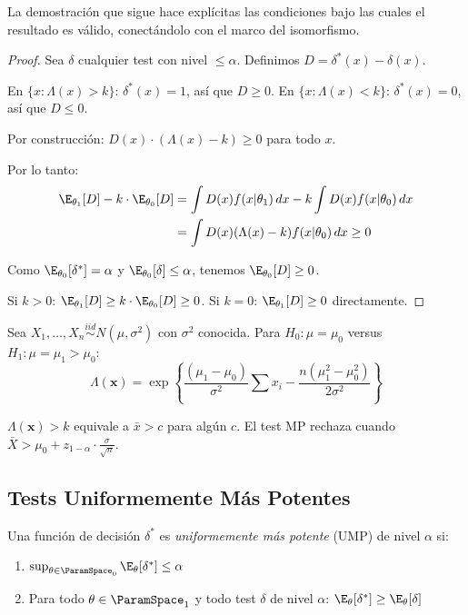 La demostración que sigue hace explícitas las condiciones bajo las cuales
el resultado es válido, conectándolo con el marco del isomorfismo.

\begin{proof}
	Sea $\delta$ cualquier test con nivel $\leq \alpha$. Definimos
	$D = \delta^*(x) - \delta(x)$.

	En $\{x : \Lambda(x) > k\}$: $\delta^*(x) = 1$, así que $D \geq 0$.
	En $\{x : \Lambda(x) < k\}$: $\delta^*(x) = 0$, así que $D \leq 0$.

	Por construcción: $D(x) \cdot (\Lambda(x) - k) \geq 0$ para todo $x$.

	Por lo tanto:
	\begin{align*}
		\E_{\theta_1}[D] - k \cdot \E_{\theta_0}[D]
		 & = \int D(x) f(x|\theta_1)\, dx - k \int D(x) f(x|\theta_0)\, dx \\
		 & = \int D(x) (\Lambda(x) - k) f(x|\theta_0)\, dx \geq 0
	\end{align*}

	Como $\E_{\theta_0}[\delta^*] = \alpha$ y $\E_{\theta_0}[\delta] \leq \alpha$,
	tenemos $\E_{\theta_0}[D] \geq 0$.

	Si $k > 0$: $\E_{\theta_1}[D] \geq k \cdot \E_{\theta_0}[D] \geq 0$.
	Si $k = 0$: $\E_{\theta_1}[D] \geq 0$ directamente.
\end{proof}

\begin{example}
	\label{ex:ch4-mp-normal}
	Sea $X_1, \ldots, X_n \overset{iid}{\sim} N(\mu, \sigma^2)$ con $\sigma^2$
	conocida. Para $H_0: \mu = \mu_0$ versus $H_1: \mu = \mu_1 > \mu_0$:
	\[
		\Lambda(\mathbf{x}) = \exp\left\{\frac{(\mu_1 - \mu_0)}{\sigma^2}\sum x_i -
		\frac{n(\mu_1^2 - \mu_0^2)}{2\sigma^2}\right\}
	\]

	$\Lambda(\mathbf{x}) > k$ equivale a $\bar{x} > c$ para algún $c$. El test
	MP rechaza cuando $\bar{X} > \mu_0 + z_{1-\alpha} \cdot \frac{\sigma}{\sqrt{n}}$.
\end{example}

\subsection{Tests Uniformemente Más Potentes}
\label{sec:ch4-ump}

\begin{definition}
	\label{def:ch4-ump}
	Una función de decisión $\delta^*$ es \emph{uniformemente más potente} (UMP) de nivel $\alpha$ si:
	\begin{enumerate}
		\item $\sup_{\theta \in \ParamSpace_0} \E_\theta[\delta^*] \leq \alpha$
		\item Para todo $\theta \in \ParamSpace_1$ y todo test $\delta$ de nivel $\alpha$:
		      $\E_\theta[\delta^*] \geq \E_\theta[\delta]$
	\end{enumerate}
\end{definition}

